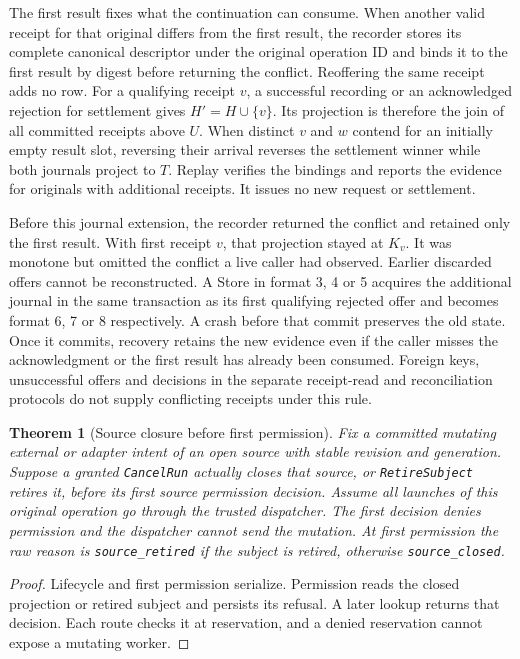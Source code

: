 \documentclass[11pt,a4paper]{article}
\newtheorem{theorem}{Theorem}[section]
\theoremstyle{definition}
\theoremstyle{remark}
\begin{document}
The first result fixes what the continuation can consume. When another valid receipt for that original differs from the first result, the recorder stores its complete canonical descriptor under the original operation ID and binds it to the first result by digest before returning the conflict. Reoffering the same receipt adds no row. For a qualifying receipt $v$, a successful recording or an acknowledged rejection for settlement gives $H'=H\cup\{v\}$. Its projection is therefore the join of all committed receipts above $U$. When distinct $v$ and $w$ contend for an initially empty result slot, reversing their arrival reverses the settlement winner while both journals project to $T$. Replay verifies the bindings and reports the evidence for originals with additional receipts. It issues no new request or settlement.

Before this journal extension, the recorder returned the conflict and retained only the first result. With first receipt $v$, that projection stayed at $K_v$. It was monotone but omitted the conflict a live caller had observed. Earlier discarded offers cannot be reconstructed. A Store in format 3, 4 or 5 acquires the additional journal in the same transaction as its first qualifying rejected offer and becomes format 6, 7 or 8 respectively. A crash before that commit preserves the old state. Once it commits, recovery retains the new evidence even if the caller misses the acknowledgment or the first result has already been consumed. Foreign keys, unsuccessful offers and decisions in the separate receipt-read and reconciliation protocols do not supply conflicting receipts under this rule.

\begin{theorem}[Source closure before first permission]
\label{thm:dichotomy}
Fix a committed mutating external or adapter intent of an open source with stable revision and generation. Suppose a granted \texttt{CancelRun} actually closes that source, or \texttt{RetireSubject} retires it, before its first source permission decision. Assume all launches of this original operation go through the trusted dispatcher. The first decision denies permission and the dispatcher cannot send the mutation. At first permission the raw reason is \texttt{source\_retired} if the subject is retired, otherwise \texttt{source\_closed}.
\end{theorem}
\begin{proof}
Lifecycle and first permission serialize. Permission reads the closed projection or retired subject and persists its refusal. A later lookup returns that decision. Each route checks it at reservation, and a denied reservation cannot expose a mutating worker.
\end{proof}
\end{document}
